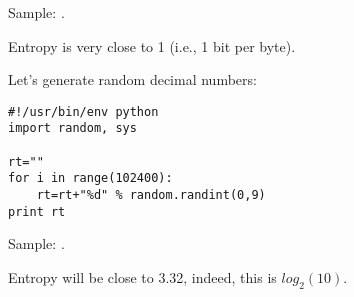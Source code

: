 Sample: .

Entropy is very close to 1 (i.e., 1 bit per byte).

Let's generate random decimal numbers:

\begin{lstlisting}
#!/usr/bin/env python
import random, sys

rt=""
for i in range(102400):
    rt=rt+"%d" % random.randint(0,9)
print rt
\end{lstlisting}

Sample: .

Entropy will be close to 3.32, indeed, this is $log_2(10)$.

